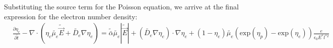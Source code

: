 \documentclass[11pt]{article}
\begin{document}
Substituting the source term for the Poisson equation, we arrive at the final expression for the electron number density:
\begin{align}
    & \frac{\partial \eta_e}{\partial \tilde{t}} - \nabla \cdot \left( \eta_e \tilde{\mu_e}\tilde{\vec{E}}   + \tilde{D_e} \nabla \eta_e \right)  = \tilde{\bar{\alpha}}\tilde{\mu_e}|\tilde{\vec{E}}| + \left( \tilde{D_e}\nabla \eta_e  \right)\cdot \nabla \eta_e + \left( 1- \eta_e \right)\tilde{\mu_e} \left( \mathrm{exp}(\eta_p)-\mathrm{exp}(\eta_e) \right) \frac{e}{\epsilon_0 E^* l^{*2}}
\end{align}
\end{document}
